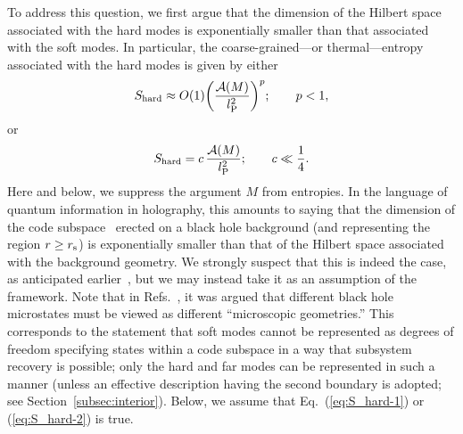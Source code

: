 \documentclass[12pt]{article}
\begin{document}
To address this question, we first argue that the dimension of 
the Hilbert space associated with the hard modes is exponentially 
smaller than that associated with the soft modes.  In particular, 
the coarse-grained---or thermal---entropy associated with the hard 
modes is given by either
%
\begin{equation}
  S_{\rm hard} \approx O(1) 
    \biggl( \frac{{\cal A}(M)}{l_{\rm P}^2} \biggr)^p;
\qquad
  p < 1,
\label{eq:S_hard-1}
\end{equation}
%
or
%
\begin{equation}
  S_{\rm hard} = c\, \frac{{\cal A}(M)}{l_{\rm P}^2};
\qquad
  c \ll \frac{1}{4}.
\label{eq:S_hard-2}
\end{equation}
%
Here and below, we suppress the argument $M$ from entropies.  In the 
language of quantum information in holography, this amounts to saying 
that the dimension of the code subspace~\cite{Almheiri:2014lwa} 
erected on a black hole background (and representing the region 
$r \geq r_{\rm s}$) is exponentially smaller than that of the 
Hilbert space associated with the background geometry.  We 
strongly suspect that this is indeed the case, as anticipated 
earlier~\cite{'tHooft:1993gx,Nomura:2013lia}, but we may instead 
take it as an assumption of the framework.  Note that in 
Refs.~\cite{Nomura:2014woa,Nomura:2014voa,Nomura:2016qum}, 
it was argued that different black hole microstates must be 
viewed as different ``microscopic geometries.''  This corresponds 
to the statement that soft modes cannot be represented as degrees 
of freedom specifying states within a code subspace in a way 
that subsystem recovery is possible; only the hard and far 
modes can be represented in such a manner (unless an effective 
description having the second boundary is adopted; see 
Section~\ref{subsec:interior}).  Below, we assume that 
Eq.~(\ref{eq:S_hard-1}) or (\ref{eq:S_hard-2}) is true.
\end{document}
